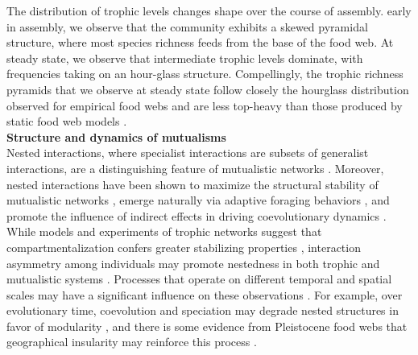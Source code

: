 \documentclass[9pt,twocolumn,twoside]{pnas-new}
\begin{document}
The distribution of trophic levels changes shape over the course of assembly.
early in assembly, we observe that the community exhibits a skewed pyramidal structure, where most species richness feeds from the base of the food web.
At steady state, we observe that intermediate trophic levels dominate, with frequencies taking on an hour-glass structure.
Compellingly, the trophic richness pyramids that we observe at steady state follow closely the hourglass distribution observed for empirical food webs and are less top-heavy than those produced by static food web models \cite{Turney2016}.\\










\noindent \textbf{Structure and dynamics of mutualisms} \\
Nested interactions, where specialist interactions are subsets of generalist interactions, are a distinguishing feature of mutualistic networks \cite{Bascompte2003}.
Moreover, nested interactions have been shown to maximize the structural stability of mutualistic networks \cite{Rohr2014}, emerge naturally via adaptive foraging behaviors \cite{Valdovinos2016,Valdovinos2019}, and promote the influence of indirect effects in driving coevolutionary dynamics \cite{Guimaraes2017}.
While models and experiments of trophic networks suggest that compartmentalization confers greater stabilizing properties \cite{Stouffer2011,Gilarranz2017}, interaction asymmetry among individuals may promote nestedness in both trophic \cite{Araujo2010} and mutualistic systems \cite{Pires2011}.
Processes that operate on different temporal and spatial scales may have a significant influence on these observations \cite{Massol2011}.
For example, over evolutionary time, coevolution and speciation may degrade nested structures in favor of modularity \cite{Ponisio2019}, and there is some evidence from Pleistocene food webs that geographical insularity may reinforce this process \cite{Yeakel2013}.
\end{document}
